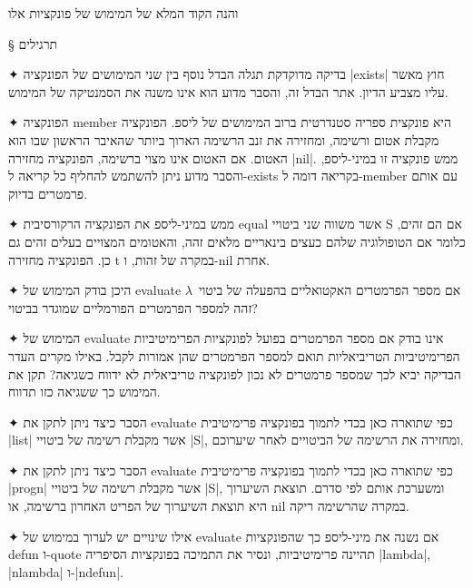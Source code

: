 והנה הקוד המלא של המימוש של פונקציות אלו
\immediate\closeout \libraryFile

\begin{LTR}
  
\end{LTR}

§ תרגילים
\begin{enumerate}
  ✦ בדיקה מדוקדקת תגלה הבדל נוסף בין שני המימושים של הפונקציה \E|exists| חוץ מאשר
  עליו מצביע הדיון. אתר הבדל זה, והסבר מדוע הוא אינו משנה את הסמנטיקה של המימוש.

  ✦ הפונקציה member היא פונקצית ספריה סטנדרטית ברוב המימושים של ליספ. הפונקציה
  מקבלת אטום ורשימה, ומחזירה את זנב הרשימה הארוך ביותר שהאיבר הראשון שבו הוא
  האטום. אם האטום אינו מצוי ברשימה, הפונקציה מחזירה \E|nil|. ממש פונקציה זו
  במיני-ליספ, והסבר מדוע ניתן להשתמש להחליף כל קריאה ל-exists בקריאה דומה
  ל-member עם אותם פרמטרים בדיוק.

  ✦ ממש במיני-ליספ את הפונקציה הרקורסיבית equal אשר משווה שני ביטויי S אם הם
  זהים, כלומר אם הטופולוגיה שלהם כעצים בינאריים מלאים זהה, והאטומים המצויים בעלים
  זהים גם כן. הפונקציה מחזירה t במקרה של זהות, ו-nil אחרת.

  ✦ היכן בודק המימוש של evaluate אם מספר הפרמטרים האקטואליים בהפעלה של ביטוי~$λ$
  זהה למספר הפרמטרים הפורמליים שמוגדר בביטוי?

  ✦ המימוש של evaluate אינו בודק אם מספר הפרמטרים בפועל לפונקציות הפרימיטיביות
  הפרימיטיביות הטריביאליות תואם למספר הפרמטרים שהן אמורות לקבל. באילו מקרים העדר
  הבדיקה יביא לכך שמספר פרמטרים לא נכון לפונקציה טריביאלית לא ידווח כשגיאה? תקן
  את המימוש כך ששגיאה כזו תדווח.

  ✦ הסבר כיצד ניתן לתקן את evaluate כפי שתוארה כאן בכדי לתמוך בפונקציה פרימיטיבית
  \E|list| אשר מקבלת רשימה של ביטויי \E|S|, ומחזירה את הרשימה של הביטויים לאחר
  שיערוכם.

  ✦ הסבר כיצד ניתן לתקן את evaluate כפי שתוארה כאן בכדי לתמוך בפונקציה פרימיטיבית
  \E|progn| אשר מקבלת רשימה של ביטויי \E|S|, ומשערכת אותם לפי סדרם. תוצאת השיערוך
  היא תוצאת השיערוך של הפריט האחרון ברשימה, או nil במקרה שהרשימה ריקה.

  ✦ אילו שינויים יש לערוך במימוש של evaluate אם נשנה את מיני-ליספ כך שהפונקציות
  defun ו-quote תהיינה פרימיטיביות, ונסיר את התמיכה בפונקציות הסיפריה \E|lambda|,
  \E|nlambda| ו-\E|ndefun|.


\end{enumerate}
